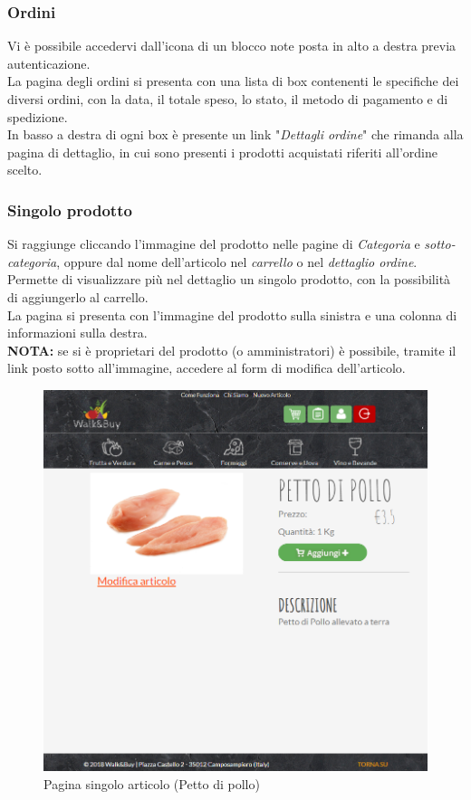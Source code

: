 	\subsubsection{Ordini}
	Vi è possibile accedervi dall'icona di un blocco note posta in alto a destra previa autenticazione.\\
	La pagina degli ordini si presenta con una lista di box contenenti le specifiche dei diversi ordini, con la data, il totale speso, lo stato, il metodo di pagamento e di spedizione.\\
	In basso a destra di ogni box è presente un link "\textit{Dettagli ordine}" che rimanda alla pagina di dettaglio, in cui sono presenti i prodotti acquistati riferiti all'ordine scelto.

	\subsubsection{Singolo prodotto}
	Si raggiunge cliccando l'immagine del prodotto nelle pagine di \textit{Categoria} e \textit{sotto-categoria}, oppure dal nome dell'articolo nel \textit{carrello} o nel \textit{dettaglio ordine}.\\ Permette di visualizzare più nel dettaglio un singolo prodotto, con la possibilità di aggiungerlo al carrello.\\
	La pagina si presenta con l'immagine del prodotto sulla sinistra e una colonna di informazioni sulla destra.\\
	\textbf{NOTA:} se si è proprietari del prodotto (o amministratori) è possibile, tramite il link posto sotto all'immagine, accedere al form di modifica dell'articolo.
	\begin{figure}[H]
		\includegraphics[width=\linewidth]{res/img/sing-prod+}
		\caption{Pagina singolo articolo (Petto di pollo)}
		\label{Pagina singolo articolo}
	\end{figure}

